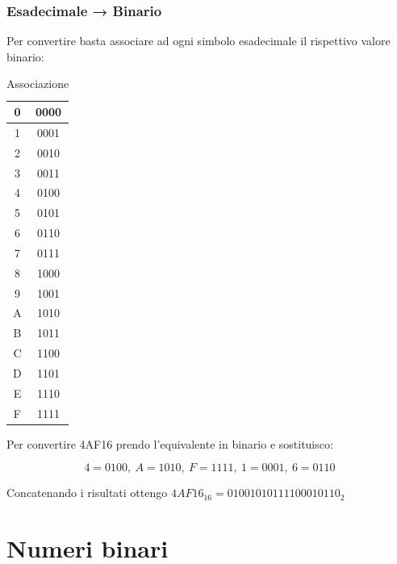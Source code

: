 \documentclass{article}
\begin{document}
\subsubsection{Esadecimale → Binario}

Per convertire basta associare ad ogni simbolo esadecimale il rispettivo valore binario:

\begin{table}[ht]
    \centering
    \begin{tabular}{c|c}
        0 & 0000\\
        \hline
        \rule{0pt}{3ex}1 & 0001\\
        \hline
        \rule{0pt}{3ex}2 & 0010\\
        \hline
        \rule{0pt}{3ex}3 & 0011\\
        \hline
        \rule{0pt}{3ex}4 & 0100\\
        \hline
        \rule{0pt}{3ex}5 & 0101\\
        \hline
        \rule{0pt}{3ex}6 & 0110\\
        \hline
        \rule{0pt}{3ex}7 & 0111\\
        \hline
        \rule{0pt}{3ex}8 & 1000\\
        \hline
        \rule{0pt}{3ex}9 & 1001\\
        \hline
        \rule{0pt}{3ex}A & 1010\\
        \hline
        \rule{0pt}{3ex}B & 1011\\
        \hline
        \rule{0pt}{3ex}C & 1100\\
        \hline
        \rule{0pt}{3ex}D & 1101\\
        \hline
        \rule{0pt}{3ex}E & 1110\\
        \hline
        \rule{0pt}{3ex}F & 1111\\
    \end{tabular}
    \caption{Associazione}
    \label{tab:hex_bin}
\end{table}

Per convertire 4AF16 prendo l'equivalente in binario e sostituisco:

$$ 4 = 0100,\
 A = 1010,\ 
 F = 1111,\ 
 1 = 0001,\ 
 6 = 0110$$

Concatenando i risultati ottengo $4AF16_{16} = 01001010111100010110_2$

\newpage

\section{Numeri binari}
\end{document}
